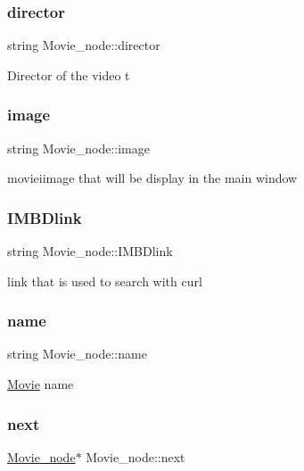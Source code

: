 \subsubsection{\texorpdfstring{director}{director}}
{\footnotesize\ttfamily string Movie\+\_\+node\+::director}

Director of the video t \mbox{\label{classMovie__node_a643cb2b9df71d9aee01eedb5d79ecd8c}} 
\subsubsection{\texorpdfstring{image}{image}}
{\footnotesize\ttfamily string Movie\+\_\+node\+::image}

movieiimage that will be display in the main window \mbox{\label{classMovie__node_afcd448d939f523e8bc80ebaa810d75a0}} 
\subsubsection{\texorpdfstring{I\+M\+B\+Dlink}{IMBDlink}}
{\footnotesize\ttfamily string Movie\+\_\+node\+::\+I\+M\+B\+Dlink}

link that is used to search with curl \mbox{\label{classMovie__node_a236fd675c12c3fb8c2f19b9468c42b8d}} 
\subsubsection{\texorpdfstring{name}{name}}
{\footnotesize\ttfamily string Movie\+\_\+node\+::name}

\hyperlink{classMovie}{Movie} name \mbox{\label{classMovie__node_a75a123d602ef3727215a1fe208bffc63}} 
\subsubsection{\texorpdfstring{next}{next}}
{\footnotesize\ttfamily \hyperlink{classMovie__node}{Movie\+\_\+node}$\ast$ Movie\+\_\+node\+::next}

